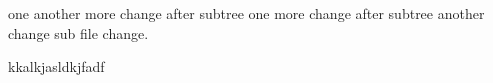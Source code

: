 one another more change after subtree
one more change after subtree
another change
sub file change.



kkalkjasldkjfadf